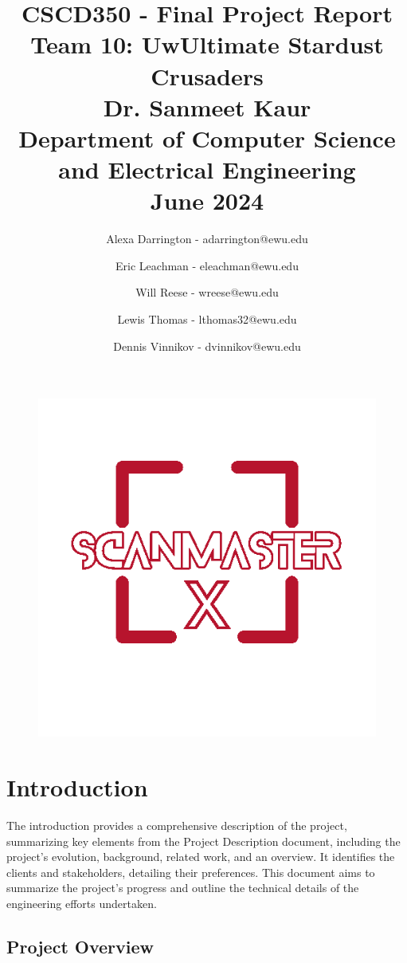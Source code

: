 \documentclass{article}
\title{CSCD350 - Final Project Report \\
Team 10: UwUltimate Stardust Crusaders \\
\large Dr. Sanmeet Kaur \\
Department of Computer Science and Electrical Engineering\\
June 2024}
\author[1]{Alexa Darrington - adarrington@ewu.edu}
\author[1]{Eric Leachman - eleachman@ewu.edu}
\author[1]{Will Reese - wreese@ewu.edu}
\author[1]{Lewis Thomas - lthomas32@ewu.edu}
\author[1]{Dennis Vinnikov - dvinnikov@ewu.edu}
\affil[1]{Eastern Washington University}
\begin{document}
\maketitle

\begin{figure}[h]
    \centering
    \includegraphics[width=.8\linewidth]{images/logo.png}
\end{figure}


\newpage


\section{Introduction}

The introduction provides a comprehensive description of the project, summarizing key elements from the Project Description document, including the project's evolution, background, related work, and an overview. It identifies the clients and stakeholders, detailing their preferences. This document aims to summarize the project's progress and outline the technical details of the engineering efforts undertaken. 

    \subsection{Project Overview}
\end{document}
